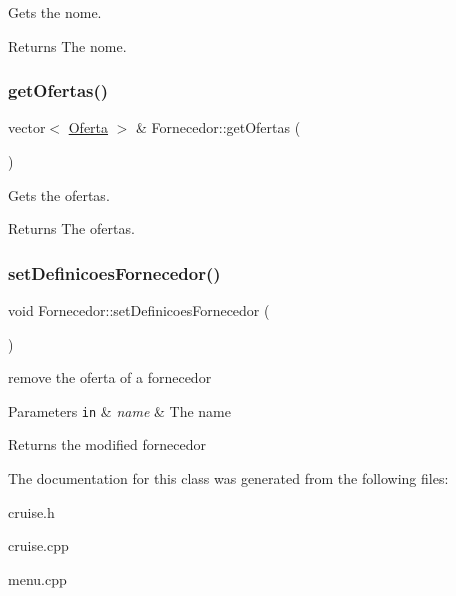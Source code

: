Gets the nome. 

\begin{DoxyReturn}{Returns}
The nome. 
\end{DoxyReturn}
\mbox{\label{classFornecedor_a7ef7f5f79e2c61aaca5d60c06b2a0051}} 
\subsubsection{\texorpdfstring{get\+Ofertas()}{getOfertas()}}
{\footnotesize\ttfamily vector$<$ \hyperlink{classOferta}{Oferta} $>$ \& Fornecedor\+::get\+Ofertas (\begin{DoxyParamCaption}{ }\end{DoxyParamCaption})}



Gets the ofertas. 

\begin{DoxyReturn}{Returns}
The ofertas. 
\end{DoxyReturn}
\mbox{\label{classFornecedor_a0a0945cbd2fd120d9eab5d5aec441b72}} 
\subsubsection{\texorpdfstring{set\+Definicoes\+Fornecedor()}{setDefinicoesFornecedor()}}
{\footnotesize\ttfamily void Fornecedor\+::set\+Definicoes\+Fornecedor (\begin{DoxyParamCaption}{ }\end{DoxyParamCaption})}



remove the oferta of a fornecedor 


\begin{DoxyParams}[1]{Parameters}
\mbox{\tt in}  & {\em name} & The name\\
\hline
\end{DoxyParams}
\begin{DoxyReturn}{Returns}
the modified fornecedor 
\end{DoxyReturn}


The documentation for this class was generated from the following files\+:\begin{DoxyCompactItemize}
\item 
cruise.\+h\item 
cruise.\+cpp\item 
menu.\+cpp\end{DoxyCompactItemize}
